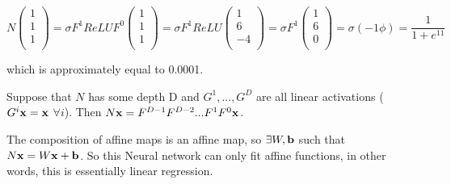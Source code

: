 \begin{example}
    $$N\begin{pmatrix}
    1\\1\\1\\ 
    \end{pmatrix} = 
    \sigma F^{1}ReLU F^{0} 
    \begin{pmatrix}1\\1\\1\\
    \end{pmatrix} = 
    \sigma F^{1}ReLU 
    \begin{pmatrix}1\\6\\-4\\
    \end{pmatrix} = 
    \sigma  F^{1} \begin{pmatrix}1\\6\\0\\
    \end{pmatrix} = 
    \sigma(-1\phi) = \frac{1}{1+e^{11}}$$
    
    which is approximately equal to 0.0001.
           
        
\end{example}

\begin{example}
Suppose that $N$ has some depth D and $G^{1},...,G^{D}$ are all linear activations ($G^{i}{\vx} = {\vx}$ $\forall i$). Then $N{\vx} = F^{D-1}F^{D-2}...F^{1}F^{0}{\vx}$.
    \begin{remark}
        The composition of affine maps is an affine map, so $\exists W, {\vb}$ such that $N{\vx} = W{\vx} + {\vb}$. So this Neural network can only fit affine functions, in other words, this is essentially linear regression.
    \end{remark}
\end{example}

